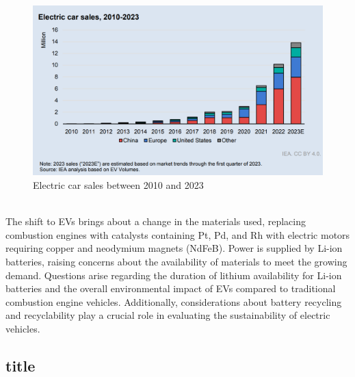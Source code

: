 \documentclass[../summary.tex]{subfiles}
\begin{document}
\begin{figure}[H]
	\centering
	\includegraphics[width=0.7\linewidth]{../images/Electric_car_sales}
	\caption{Electric car sales between 2010 and 2023}
	\label{fig:electriccarsales}
\end{figure}
\ \\
The shift to EVs brings about a change in the materials used, replacing combustion engines with catalysts containing Pt, Pd, and Rh with electric motors requiring copper and neodymium magnets (NdFeB). Power is supplied by Li-ion batteries, raising concerns about the availability of materials to meet the growing demand. Questions arise regarding the duration of lithium availability for Li-ion batteries and the overall environmental impact of EVs compared to traditional combustion engine vehicles. Additionally, considerations about battery recycling and recyclability play a crucial role in evaluating the sustainability of electric vehicles.

\subsection{title}
\end{document}
